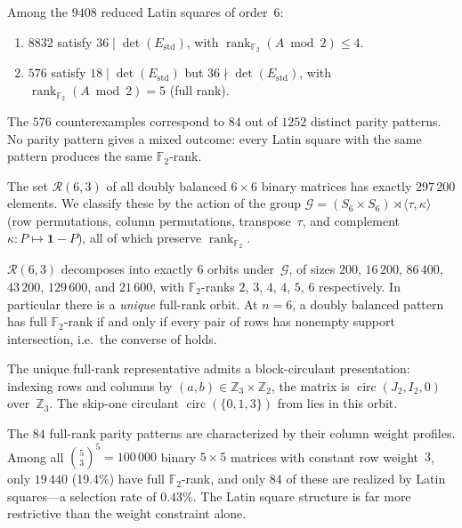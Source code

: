 \documentclass[11pt,a4paper]{article}
\newcommand{\ZZ}{\mathbb{Z}}
\newcommand{\FF}{\mathbb{F}}
\newcommand{\one}{\mathbf{1}}
\newcommand{\rank}{\operatorname{rank}}
\newcommand{\Estd}{E_{\mathrm{std}}}
\begin{document}
\begin{proposition}\label{prop:n6}
Among the $9408$ reduced Latin squares of order~$6$:
\begin{enumerate}[label=\textup{(\roman*)}]
  \item $8832$ satisfy $36\mid\det(\Estd)$, with
        $\rank_{\FF_2}(A\bmod 2)\le 4$.
  \item $576$ satisfy $18\mid\det(\Estd)$ but $36\nmid\det(\Estd)$,
        with $\rank_{\FF_2}(A\bmod 2)=5$ (full rank).
\end{enumerate}
The $576$ counterexamples correspond to $84$ out of $1252$ distinct
parity patterns.  No parity pattern gives a mixed outcome: every Latin
square with the same pattern produces the same $\FF_2$-rank.
\end{proposition}

The set $\mathcal{R}(6,3)$ of all doubly balanced $6\times 6$
binary matrices has exactly $297\,200$ elements.  We classify these by
the action of the group
$\mathcal{G}=(S_6\times S_6)\rtimes\langle\tau,\kappa\rangle$
(row permutations, column permutations, transpose~$\tau$, and
complement~$\kappa:P\mapsto\one-P$), all of which preserve
$\rank_{\FF_2}$.

\begin{proposition}[Orbit classification at $n=6$]\label{prop:n6-orbits}
$\mathcal{R}(6,3)$ decomposes into exactly $6$ orbits under~$\mathcal{G}$,
of sizes $200$, $16\,200$, $86\,400$, $43\,200$, $129\,600$,
and $21\,600$, with $\FF_2$-ranks $2$, $3$, $4$, $4$, $5$, $6$
respectively.  In particular there is a \emph{unique} full-rank orbit.
At $n=6$, a doubly balanced pattern has full $\FF_2$-rank if and only
if every pair of rows has nonempty support intersection, i.e.\
the converse of\/  holds.
\end{proposition}

\begin{remark}\label{rem:n6-structure}
The unique full-rank representative admits a block-circulant presentation:
indexing rows and columns by $(a,b)\in\ZZ_3\times\ZZ_2$,
the matrix is $\operatorname{circ}(J_2,I_2,0)$ over~$\ZZ_3$.
The skip-one circulant $\operatorname{circ}(\{0,1,3\})$ from
 lies in this orbit.
\end{remark}

\begin{remark}
The $84$ full-rank parity patterns are characterized by their column
weight profiles.  Among all $\binom{5}{3}^5=100\,000$ binary
$5\times 5$ matrices with constant row weight~$3$, only $19\,440$
(19.4\%) have full $\FF_2$-rank, and only $84$ of these are realized by
Latin squares---a selection rate of $0.43\%$.  The Latin square structure
is far more restrictive than the weight constraint alone.
\end{remark}
\end{document}
